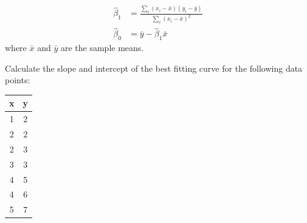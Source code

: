 \begin{align*}
\hat{\beta}_1 &= \frac{\sum_i (x_i - \bar{x})(y_i - \bar{y})} {\sum_i (x_i - \bar{x})^2} \\
\hat{\beta}_0 &= \bar{y} - \hat{\beta}_1 \bar{x}
\end{align*}
\noindent where $\bar{x}$ and $\bar{y}$ are the sample means.





\begin{exerciseboxpaper}
Calculate the slope and intercept of the best fitting curve for the following data points:\\

\begin{center}
\renewcommand{\arraystretch}{1.25}
\begin{tabular}{c|c} \hline
{\bf x} & {\bf y} \\ \hline
1 & 2 \\
2 & 2 \\
2 & 3 \\
3 & 3 \\ 
4 & 5 \\
4 & 6 \\
5 & 7 \\ \hline
\end{tabular}
\end{center}
\end{exerciseboxpaper}

